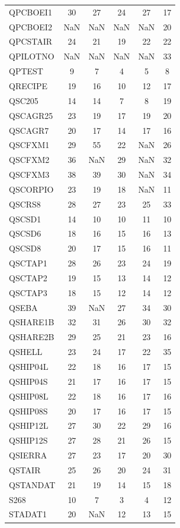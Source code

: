 \begin{longtable}{lccccc}
QPCBOEI1 & 30 & 27 & 24 & 27 & 17 \\
QPCBOEI2 & NaN & NaN & NaN & NaN & 20 \\
QPCSTAIR & 24 & 21 & 19 & 22 & 22 \\
QPILOTNO & NaN & NaN & NaN & NaN & 33 \\
QPTEST & 9 & 7 & 4 & 5 & 8 \\
QRECIPE & 19 & 16 & 10 & 12 & 17 \\
QSC205 & 14 & 14 & 7 & 8 & 19 \\
QSCAGR25 & 23 & 19 & 17 & 19 & 20 \\
QSCAGR7 & 20 & 17 & 14 & 17 & 16 \\
QSCFXM1 & 29 & 55 & 22 & NaN & 26 \\
QSCFXM2 & 36 & NaN & 29 & NaN & 32 \\
QSCFXM3 & 38 & 39 & 30 & NaN & 34 \\
QSCORPIO & 23 & 19 & 18 & NaN & 11 \\
QSCRS8 & 28 & 27 & 23 & 25 & 33 \\
QSCSD1 & 14 & 10 & 10 & 11 & 10 \\
QSCSD6 & 18 & 16 & 15 & 16 & 13 \\
QSCSD8 & 20 & 17 & 15 & 16 & 11 \\
QSCTAP1 & 28 & 26 & 23 & 24 & 19 \\
QSCTAP2 & 19 & 15 & 13 & 14 & 12 \\
QSCTAP3 & 18 & 15 & 12 & 14 & 12 \\
QSEBA & 39 & NaN & 27 & 34 & 30 \\
QSHARE1B & 32 & 31 & 26 & 30 & 32 \\
QSHARE2B & 29 & 25 & 21 & 23 & 16 \\
QSHELL & 23 & 24 & 17 & 22 & 35 \\
QSHIP04L & 22 & 18 & 16 & 17 & 15 \\
QSHIP04S & 21 & 17 & 16 & 17 & 15 \\
QSHIP08L & 22 & 18 & 16 & 17 & 16 \\
QSHIP08S & 20 & 17 & 16 & 17 & 15 \\
QSHIP12L & 27 & 30 & 22 & 29 & 16 \\
QSHIP12S & 27 & 28 & 21 & 26 & 15 \\
QSIERRA & 27 & 23 & 17 & 20 & 30 \\
QSTAIR & 25 & 26 & 20 & 24 & 31 \\
QSTANDAT & 21 & 19 & 14 & 15 & 18 \\
S268 & 10 & 7 & 3 & 4 & 12 \\
STADAT1 & 20 & NaN & 12 & 13 & 15 \\

\end{longtable}
